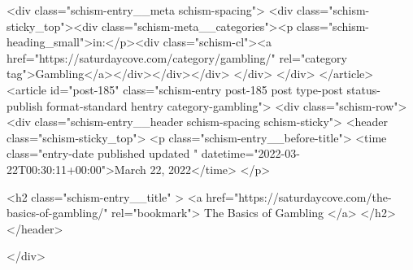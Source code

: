 {		<div class="schism-entry__meta schism-spacing">			<div class="schism-sticky_top"><div class="schism-meta__categories"><p class="schism-heading_small">in:</p><div class="schism-cl"><a href="https://saturdaycove.com/category/gambling/" rel="category tag">Gambling</a></div></div></div>		</div>
	</div>
</article>
<article id="post-185" class="schism-entry post-185 post type-post status-publish format-standard hentry category-gambling">
	<div class="schism-row">		<div class="schism-entry__header schism-spacing schism-sticky">			<header class="schism-sticky_top">				<p class="schism-entry__before-title">
					<time class="entry-date published updated " datetime="2022-03-22T00:30:11+00:00">March 22, 2022</time>				</p>

				<h2 class="schism-entry__title" >
					<a href="https://saturdaycove.com/the-basics-of-gambling/" rel="bookmark">
						The Basics of Gambling					</a>
				</h2>
			</header>

					</div>

}
